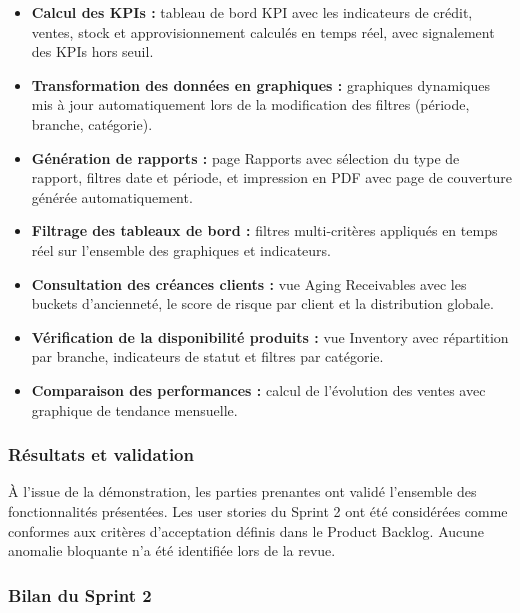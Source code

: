 \documentclass[a4paper,12pt]{report}
\begin{document}
\begin{itemize}
    \item \textbf{Calcul des KPIs :} tableau de bord KPI avec les indicateurs de crédit, ventes, stock et approvisionnement calculés en temps réel, avec signalement des KPIs hors seuil.

    \item \textbf{Transformation des données en graphiques :} graphiques dynamiques mis à jour automatiquement lors de la modification des filtres (période, branche, catégorie).

    \item \textbf{Génération de rapports :} page Rapports avec sélection du type de rapport, filtres date et période, et impression en PDF avec page de couverture générée automatiquement.

    \item \textbf{Filtrage des tableaux de bord :} filtres multi-critères appliqués en temps réel sur l'ensemble des graphiques et indicateurs.

    \item \textbf{Consultation des créances clients :} vue Aging Receivables avec les buckets d'ancienneté, le score de risque par client et la distribution globale.

    \item \textbf{Vérification de la disponibilité produits :} vue Inventory avec répartition par branche, indicateurs de statut et filtres par catégorie.

    \item \textbf{Comparaison des performances :} calcul de l'évolution des ventes avec graphique de tendance mensuelle.
\end{itemize}

\subsubsection*{Résultats et validation}

À l'issue de la démonstration, les parties prenantes ont validé l'ensemble des fonctionnalités présentées. Les user stories du Sprint 2 ont été considérées comme conformes aux critères d'acceptation définis dans le Product Backlog. Aucune anomalie bloquante n'a été identifiée lors de la revue.

\subsubsection*{Bilan du Sprint 2}
\end{document}
